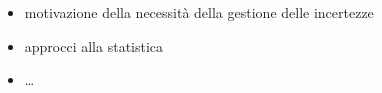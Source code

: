 
\begin{itemize}
  \item motivazione della necessità della gestione delle incertezze
  \item approcci alla statistica
  \item \dots
\end{itemize}
